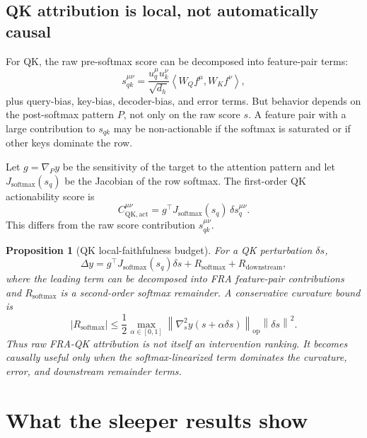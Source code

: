 \documentclass[11pt]{article}
\newcommand{\ip}[2]{\left\langle #1,#2\right\rangle}
\newcommand{\norm}[1]{\left\lVert #1\right\rVert}
\newcommand{\softmax}{\operatorname{softmax}}
\newcommand{\QK}{\mathrm{QK}}
\theoremstyle{definition}
\theoremstyle{plain}
\newtheorem{proposition}{Proposition}
\theoremstyle{remark}
\begin{document}
\subsection{QK attribution is local, not automatically causal}

For QK, the raw pre-softmax score can be decomposed into feature-pair terms:
\begin{equation}
    s_{qk}^{\mu\nu}
    =
    \frac{u_q^\mu u_k^\nu}{\sqrt{d_h}}
    \ip{W_Q f^\mu}{W_K f^\nu},
    \label{eq:qk_pair}
\end{equation}
plus query-bias, key-bias, decoder-bias, and error terms.  But behavior depends
on the post-softmax pattern $P$, not only on the raw score $s$.  A feature pair
with a large contribution to $s_{qk}$ may be non-actionable if the softmax is
saturated or if other keys dominate the row.

Let $g=\nabla_P y$ be the sensitivity of the target to the attention pattern and
let $J_{\softmax}(s_q)$ be the Jacobian of the row softmax.  The first-order
QK actionability score is
\begin{equation}
    C_{\QK,\mathrm{act}}^{\mu\nu}
    =
    g^\top J_{\softmax}(s_q)\,\delta s_q^{\mu\nu}.
    \label{eq:qk_actionability}
\end{equation}
This differs from the raw score contribution $s_{qk}^{\mu\nu}$.

\begin{proposition}[QK local-faithfulness budget]
For a QK perturbation $\delta s$,
\begin{equation}
    \Delta y
    =
    g^\top J_{\softmax}(s_q)\delta s
    + R_{\softmax}
    + R_{\mathrm{downstream}},
\end{equation}
where the leading term can be decomposed into FRA feature-pair contributions and
$R_{\softmax}$ is a second-order softmax remainder.  A conservative curvature
bound is
\begin{equation}
    |R_{\softmax}|
    \le
    \frac{1}{2}
    \max_{\alpha\in[0,1]}
    \left\|\nabla_s^2 y(s+\alpha\delta s)\right\|_{\mathrm{op}}
    \norm{\delta s}^2.
\end{equation}
Thus raw FRA-QK attribution is not itself an intervention ranking.  It becomes
causally useful only when the softmax-linearized term dominates the curvature,
error, and downstream remainder terms.
\end{proposition}

\section{What the sleeper results show}
\end{document}
